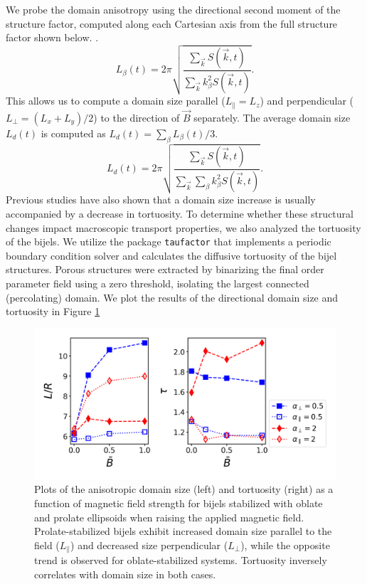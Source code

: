 We probe the domain anisotropy using the directional second moment of the structure factor, computed along each Cartesian axis from the full structure factor shown
below. \cite{jansen_bijels_2011, gunther_timescales_2014}. 
    \begin{equation}
    L_\beta(t)=2\pi\sqrt{\frac{\sum_{\vec{k}}S(\vec{k},t)}{\sum_{\vec{k}}k_\beta^2 S(\vec{k},t)}} .
    \end{equation}
    This allows us to compute a domain size parallel
    (\(L_\parallel=L_z\)) and perpendicular (\(L_\perp=(L_x+L_y)/2\)) to the
    direction of \(\vec{B}\) separately. The average domain size \(L_d(t)\)
    is computed as \(L_d(t)=\sum_\beta L_\beta(t) / 3\).
    \begin{equation}
    L_d(t)=2\pi\sqrt{\frac{\sum_{\vec{k}}S(\vec{k},t)}{\sum_{\vec{k}}\sum_\beta k_\beta^2 S(\vec{k},t)}} .
    \end{equation}
Previous studies have also shown that a domain size increase is usually accompanied by a decrease in
tortuosity. \cite{karthikeyan_formation_2024} To determine whether these structural 
changes impact macroscopic transport properties, we also analyzed the tortuosity of the bijels. We utilize the package \texttt{taufactor} that implements
a periodic boundary condition solver and calculates the diffusive tortuosity of the bijel structures. Porous structures were 
extracted by binarizing the final order parameter field using a zero threshold, isolating the largest connected (percolating) domain. We plot the results of
the directional domain size and tortuosity in Figure \ref{fig:domain_size_aniso-field_on}

\begin{figure} 
    \centering 
    \includegraphics[scale=0.6]{../figures/results/paper2/domain_size_aniso-field_on.png} 
    \caption{Plots of the anisotropic domain size (left) and tortuosity (right) as a function of magnetic field strength for bijels 
             stabilized with oblate and prolate ellipsoids when raising the applied magnetic field. Prolate-stabilized bijels 
             exhibit increased domain size parallel to the field ($L_{\parallel}$) and decreased size perpendicular ($L_{\perp}$), 
             while the opposite trend is observed for oblate-stabilized systems. Tortuosity inversely correlates with domain size in 
             both cases.} 
    \label{fig:domain_size_aniso-field_on} 
\end{figure}

